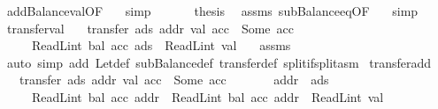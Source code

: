 \begin{isabellebody}
\ addBalance{\isacharunderscore}{\kern0pt}val{}{\isacharbrackleft}{\kern0pt}OF\ {\isacharasterisk}{\kern0pt}{\isacharasterisk}{\kern0pt}{\isacharbrackright}{\kern0pt}\ \isamarkupfalse%
\ simp\isanewline
\ \ \isamarkupfalse%
\ {\isacharasterisk}{\kern0pt}\ \isamarkupfalse%
\ {\isacharquery}{\kern0pt}thesis\ \isamarkupfalse%
\ assms{\isacharparenleft}{\kern0pt}{}{\isacharparenright}{\kern0pt}\ subBalance{\isacharunderscore}{\kern0pt}eq{\isacharbrackleft}{\kern0pt}OF\ {\isacharasterisk}{\kern0pt}{\isacharbrackright}{\kern0pt}\ \isamarkupfalse%
\ simp\isanewline
{}\isamarkupfalse%
%
\endisatagproof
{\isafoldproof}%
%
\isadelimproof
\isanewline
%
\endisadelimproof
\isanewline
{}\isamarkupfalse%
\ transfer{\isacharunderscore}{\kern0pt}val{}{\isacharcolon}{\kern0pt}\isanewline
\ \ \ {\isachardoublequoteopen}transfer\ ads\ addr\ val\ acc\ {\isacharequal}{\kern0pt}\ Some\ acc{\isacharprime}{\kern0pt}{\isachardoublequoteclose}\isanewline
\ \ \ \ \ {\isachardoublequoteopen}ReadL\isactrlsub i\isactrlsub n\isactrlsub t\ {\isacharparenleft}{\kern0pt}bal\ {\isacharparenleft}{\kern0pt}acc\ ads{\isacharparenright}{\kern0pt}{\isacharparenright}{\kern0pt}\ {\isacharminus}{\kern0pt}\ ReadL\isactrlsub i\isactrlsub n\isactrlsub t\ val\ {\isasymge}\ {}{\isachardoublequoteclose}\isanewline
%
\isadelimproof
%
\endisadelimproof
%
\isatagproof
{}\isamarkupfalse%
\ assms\ \isamarkupfalse%
\ {\isacharparenleft}{\kern0pt}auto\ simp\ add{\isacharcolon}{\kern0pt}\ Let{\isacharunderscore}{\kern0pt}def\ subBalance{\isacharunderscore}{\kern0pt}def\ transfer{\isacharunderscore}{\kern0pt}def\ split{\isacharcolon}{\kern0pt}if{\isacharunderscore}{\kern0pt}split{\isacharunderscore}{\kern0pt}asm{\isacharparenright}{\kern0pt}%
\endisatagproof
{\isafoldproof}%
%
\isadelimproof
\isanewline
%
\endisadelimproof
\isanewline
{}\isamarkupfalse%
\ transfer{\isacharunderscore}{\kern0pt}add{\isacharcolon}{\kern0pt}\isanewline
\ \ \ {\isachardoublequoteopen}transfer\ ads\ addr\ val\ acc\ {\isacharequal}{\kern0pt}\ Some\ acc{\isacharprime}{\kern0pt}{\isachardoublequoteclose}\isanewline
\ \ \ \ \ \ \ {\isachardoublequoteopen}addr\ {\isasymnoteq}\ ads{\isachardoublequoteclose}\isanewline
\ \ \ \ \ {\isachardoublequoteopen}ReadL\isactrlsub i\isactrlsub n\isactrlsub t\ {\isacharparenleft}{\kern0pt}bal\ {\isacharparenleft}{\kern0pt}acc{\isacharprime}{\kern0pt}\ addr{\isacharparenright}{\kern0pt}{\isacharparenright}{\kern0pt}\ {\isacharequal}{\kern0pt}\ ReadL\isactrlsub i\isactrlsub n\isactrlsub t\ {\isacharparenleft}{\kern0pt}bal\ {\isacharparenleft}{\kern0pt}acc\ addr{\isacharparenright}{\kern0pt}{\isacharparenright}{\kern0pt}\ {\isacharplus}{\kern0pt}\ ReadL\isactrlsub i\isactrlsub n\isactrlsub t\ val{\isachardoublequoteclose}\isanewline

\end{isabellebody}

